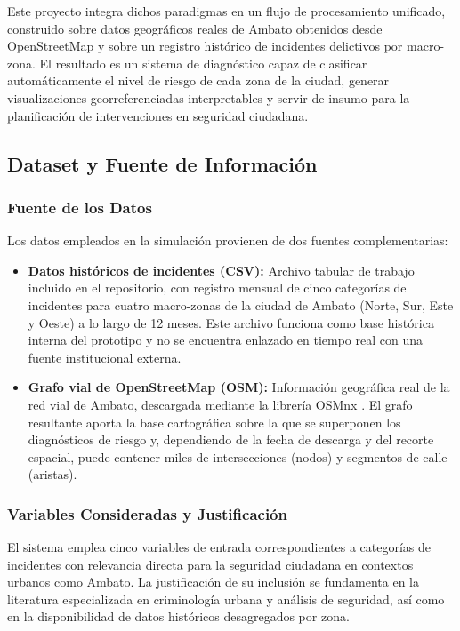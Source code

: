 \documentclass[11pt]{article}
\begin{document}
Este proyecto integra dichos paradigmas en un flujo de procesamiento unificado, construido sobre datos geográficos reales de Ambato obtenidos desde OpenStreetMap y sobre un registro histórico de incidentes delictivos por macro-zona. El resultado es un sistema de diagnóstico capaz de clasificar automáticamente el nivel de riesgo de cada zona de la ciudad, generar visualizaciones georreferenciadas interpretables y servir de insumo para la planificación de intervenciones en seguridad ciudadana.

\subsection{Dataset y Fuente de Información}

\subsubsection{Fuente de los Datos}

Los datos empleados en la simulación provienen de dos fuentes complementarias:

\begin{itemize}
    \item \textbf{Datos históricos de incidentes (CSV):} Archivo tabular de trabajo incluido en el repositorio, con registro mensual de cinco categorías de incidentes para cuatro macro-zonas de la ciudad de Ambato (Norte, Sur, Este y Oeste) a lo largo de 12 meses. Este archivo funciona como base histórica interna del prototipo y no se encuentra enlazado en tiempo real con una fuente institucional externa.
    \item \textbf{Grafo vial de OpenStreetMap (OSM):} Información geográfica real de la red vial de Ambato, descargada mediante la librería OSMnx \cite{b10}. El grafo resultante aporta la base cartográfica sobre la que se superponen los diagnósticos de riesgo y, dependiendo de la fecha de descarga y del recorte espacial, puede contener miles de intersecciones (nodos) y segmentos de calle (aristas).
\end{itemize}

\subsubsection{Variables Consideradas y Justificación}

El sistema emplea cinco variables de entrada correspondientes a categorías de incidentes con relevancia directa para la seguridad ciudadana en contextos urbanos como Ambato. La justificación de su inclusión se fundamenta en la literatura especializada en criminología urbana y análisis de seguridad, así como en la disponibilidad de datos históricos desagregados por zona.
\end{document}
